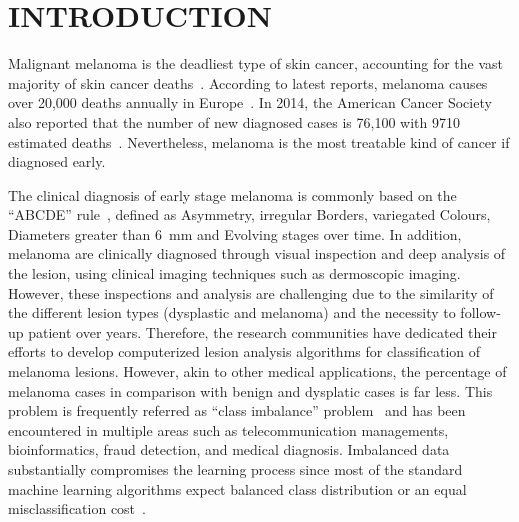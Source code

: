 \graphicspath{ {./content/intro/figures/} }

\section{\uppercase{Introduction}}
\label{sec:intro}  %

\noindent Malignant melanoma is the deadliest type of skin cancer, accounting for the vast majority of skin cancer deaths~\cite{CancerFactsFigures2014}. 
According to latest reports, melanoma causes over 20,000 deaths annually in Europe~\cite{forsea2012melanoma}. 
In 2014, the American Cancer Society also reported that the number of new diagnosed cases is 76,100 with 9710 estimated deaths~\cite{CancerFactsFigures2014}. 
Nevertheless, melanoma is the most treatable kind of cancer if diagnosed early. 

The clinical diagnosis of early stage melanoma is commonly based on the ``ABCDE'' rule~\cite{abbasi2004early}, defined as Asymmetry, irregular Borders, variegated Colours, Diameters greater than \SI{6}{\milli \metre} and Evolving stages over time. 
In addition, melanoma are clinically diagnosed through visual inspection and deep analysis of the lesion, using clinical imaging techniques such as dermoscopic imaging. 
However, these inspections and analysis are challenging due to the similarity of the different lesion types (dysplastic and melanoma) and the necessity to follow-up patient over years.
Therefore, the research communities have dedicated their efforts to develop computerized lesion analysis algorithms for classification of melanoma lesions. 
However, akin to other medical applications, the percentage of melanoma cases in comparison with benign and dysplatic cases is far less. 
This problem is frequently referred as ``class imbalance'' problem~\cite{prati2009data} and has been encountered in multiple areas such as telecommunication managements, bioinformatics, fraud detection, and medical diagnosis. 
Imbalanced data substantially compromises the learning process since most of the standard machine learning algorithms expect balanced class distribution or an equal misclassification cost~\cite{he2009learning}.

